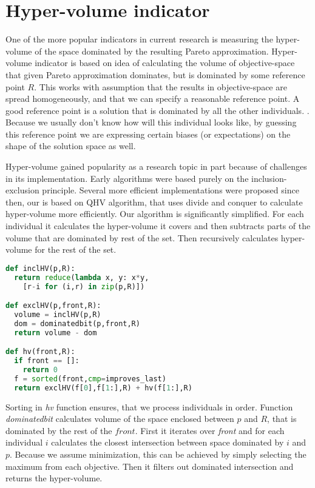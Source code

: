\documentclass[12pt,oneside]{fithesis2}
\begin{document}
\section{Hyper-volume indicator}
One of the more popular indicators in current research is measuring the hyper-volume of the space dominated by the resulting Pareto approximation. Hyper-volume indicator is based on idea of calculating the volume of objective-space that given Pareto approximation dominates, but is dominated by some reference point $R$. This works with assumption that the results in objective-space are spread homogeneously, and that we can specify a reasonable reference point. A good reference point is a solution that is dominated by all the other individuals. \cite{auger2009theory}. Because we usually don't know how will this individual looks like, by guessing this reference point we are expressing certain biases (or expectations) on the shape of the solution space as well.

Hyper-volume gained popularity as a research topic in part because of challenges in its implementation. Early algorithms were based purely on the inclusion-exclusion principle\cite{wu2001metrics}. Several more efficient implementations were proposed since then, our is based on QHV algorithm\cite{russo2012quick}, that uses divide and conquer to calculate hyper-volume more efficiently. Our algorithm is significantly simplified. For each individual it calculates the hyper-volume it covers and then subtracts parts of the volume that are dominated by rest of the set. Then recursively calculates hyper-volume for the rest of the set.

\begin{lstlisting}[language=Python,label=eps_example,caption=Hypervolume indicator implementation]
def inclHV(p,R):
  return reduce(lambda x, y: x*y,
    [r-i for (i,r) in zip(p,R)])

def exclHV(p,front,R):
  volume = inclHV(p,R)
  dom = dominatedbit(p,front,R)
  return volume - dom

def hv(front,R):
  if front == []:
    return 0
  f = sorted(front,cmp=improves_last) 
  return exclHV(f[0],f[1:],R) + hv(f[1:],R)
\end{lstlisting}

Sorting in \emph{hv} function ensures, that we process individuals in order. Function \emph{dominatedbit} calculates volume of the space enclosed between $p$ and $R$, that is dominated by the rest of the $front$. First it iterates over \emph{front} and for each individual $i$ calculates the closest intersection between space dominated by $i$ and $p$. Because we assume minimization, this can be achieved by simply selecting the maximum from each objective. Then it filters out dominated intersection and returns the hyper-volume.
\end{document}
